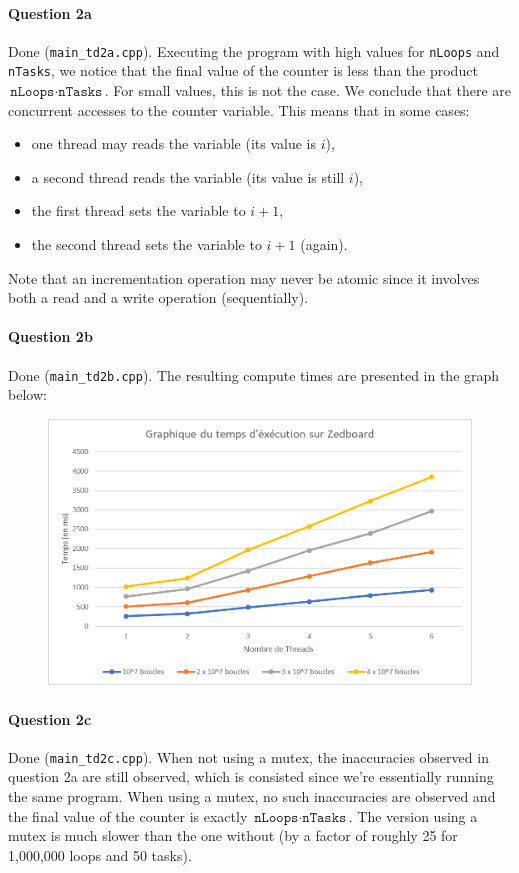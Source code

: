 \documentclass[a4paper,oneside,11pt]{article}
\begin{document}
\paragraph{Question 2a} Done (\texttt{main\_td2a.cpp}). Executing the program with high values for \texttt{nLoops} and \texttt{nTasks}, we notice that the final value of the counter is less than the product $\texttt{nLoops}\cdot\texttt{nTasks}$. For small values, this is not the case. We conclude that there are concurrent accesses to the counter variable. This means that in some cases:
\begin{itemize}
  \item  one thread may reads the variable (its value is $i$),
  \item a second thread reads the variable (its value is still $i$),
  \item the first thread sets the variable to $i+1$,
  \item the second thread sets the variable to $i+1$ (again).
\end{itemize}

Note that an incrementation operation may never be atomic since it involves both a read and a write operation (sequentially).

\paragraph{Question 2b} Done (\texttt{main\_td2b.cpp}). The resulting compute times are presented in the graph below:

\begin{figure}[ht!]
  \includegraphics[width=\textwidth]{graph.png}
\end{figure}

\paragraph{Question 2c} Done (\texttt{main\_td2c.cpp}). When not using a mutex, the inaccuracies observed in question 2a are still observed, which is consisted since we're essentially running the same program. When using a mutex, no such inaccuracies are observed and the final value of the counter is exactly $\texttt{nLoops}\cdot\texttt{nTasks}$. The version using a mutex is much slower than the one without (by a factor of roughly 25 for 1,000,000 loops and 50 tasks).
\end{document}

